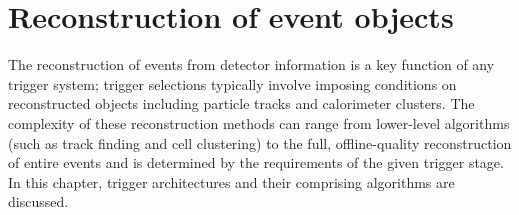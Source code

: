 \section{Reconstruction of event objects}

The reconstruction of events from detector information is a key function of any trigger system; trigger selections typically involve imposing conditions on reconstructed objects including particle tracks and calorimeter clusters. 
The complexity of these reconstruction methods can range from lower-level algorithms (such as track finding and cell clustering) to the full, offline-quality reconstruction of entire events and is determined by the requirements of the given trigger stage. In this chapter, trigger architectures and their comprising algorithms are discussed.





